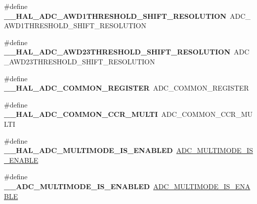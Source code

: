 \begin{DoxyCompactItemize}
\#define {\bfseries \+\_\+\+\_\+\+H\+A\+L\+\_\+\+A\+D\+C\+\_\+\+A\+W\+D1\+T\+H\+R\+E\+S\+H\+O\+L\+D\+\_\+\+S\+H\+I\+F\+T\+\_\+\+R\+E\+S\+O\+L\+U\+T\+I\+ON}~A\+D\+C\+\_\+\+A\+W\+D1\+T\+H\+R\+E\+S\+H\+O\+L\+D\+\_\+\+S\+H\+I\+F\+T\+\_\+\+R\+E\+S\+O\+L\+U\+T\+I\+ON
\item 
\mbox{\label{group___h_a_l___a_d_c___aliased___macros_ga4038d6abc1b95e035a2a0b51fb999db2}} 
\#define {\bfseries \+\_\+\+\_\+\+H\+A\+L\+\_\+\+A\+D\+C\+\_\+\+A\+W\+D23\+T\+H\+R\+E\+S\+H\+O\+L\+D\+\_\+\+S\+H\+I\+F\+T\+\_\+\+R\+E\+S\+O\+L\+U\+T\+I\+ON}~A\+D\+C\+\_\+\+A\+W\+D23\+T\+H\+R\+E\+S\+H\+O\+L\+D\+\_\+\+S\+H\+I\+F\+T\+\_\+\+R\+E\+S\+O\+L\+U\+T\+I\+ON
\item 
\mbox{\label{group___h_a_l___a_d_c___aliased___macros_ga00ebbedf4015e4538720e7a6dbacce59}} 
\#define {\bfseries \+\_\+\+\_\+\+H\+A\+L\+\_\+\+A\+D\+C\+\_\+\+C\+O\+M\+M\+O\+N\+\_\+\+R\+E\+G\+I\+S\+T\+ER}~A\+D\+C\+\_\+\+C\+O\+M\+M\+O\+N\+\_\+\+R\+E\+G\+I\+S\+T\+ER
\item 
\mbox{\label{group___h_a_l___a_d_c___aliased___macros_ga8bf50f7c58849d4cd141a421d55b148d}} 
\#define {\bfseries \+\_\+\+\_\+\+H\+A\+L\+\_\+\+A\+D\+C\+\_\+\+C\+O\+M\+M\+O\+N\+\_\+\+C\+C\+R\+\_\+\+M\+U\+L\+TI}~A\+D\+C\+\_\+\+C\+O\+M\+M\+O\+N\+\_\+\+C\+C\+R\+\_\+\+M\+U\+L\+TI
\item 
\mbox{\label{group___h_a_l___a_d_c___aliased___macros_ga79f75f2e379c482c38441c050efc7225}} 
\#define {\bfseries \+\_\+\+\_\+\+H\+A\+L\+\_\+\+A\+D\+C\+\_\+\+M\+U\+L\+T\+I\+M\+O\+D\+E\+\_\+\+I\+S\+\_\+\+E\+N\+A\+B\+L\+ED}~\hyperlink{group___a_d_c_ex___private___macro_ga44487b8068ac9f116ab789148f8d48c3}{A\+D\+C\+\_\+\+M\+U\+L\+T\+I\+M\+O\+D\+E\+\_\+\+I\+S\+\_\+\+E\+N\+A\+B\+LE}
\item 
\mbox{\label{group___h_a_l___a_d_c___aliased___macros_gaa5b9fcac48711d597023aecdb11afc51}} 
\#define {\bfseries \+\_\+\+\_\+\+A\+D\+C\+\_\+\+M\+U\+L\+T\+I\+M\+O\+D\+E\+\_\+\+I\+S\+\_\+\+E\+N\+A\+B\+L\+ED}~\hyperlink{group___a_d_c_ex___private___macro_ga44487b8068ac9f116ab789148f8d48c3}{A\+D\+C\+\_\+\+M\+U\+L\+T\+I\+M\+O\+D\+E\+\_\+\+I\+S\+\_\+\+E\+N\+A\+B\+LE}
\item 

\end{DoxyCompactItemize}

